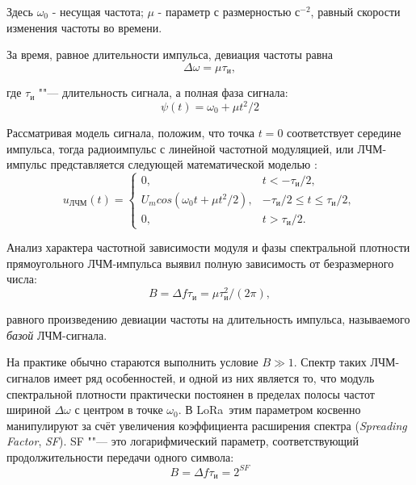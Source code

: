 Здесь $\omega_0$ - несущая частота; $\mu$ - параметр с размерностью с$^{-2}$, 
равный скорости изменения частоты во времени.

За время, равное длительности импульса, девиация частоты равна
\begin{equation}
	\Delta \omega = \mu \tau_{\text{и}},
\end{equation}

где $\tau_{\text{и}}$ ""--- длительность сигнала, а полная фаза сигнала:
\begin{equation}
	\psi(t) = \omega_0 + \mu t{^2}/2
\end{equation}

Рассматривая модель сигнала, положим, что точка $t = 0$ соответствует середине импульса, 
тогда радиоимпульс с линейной частотной модуляцией, или ЛЧМ-импульс представляется 
следующей математической моделью \cite{Baskakov2003}:
\begin{equation}
	u_\text{ЛЧМ}(t) = 
	\begin{cases}
		0, & t < -\tau_\text{и}/2,\\
		U_m cos(\omega_0 t + \mu t{^2}/2), & -\tau_\text{и}/2 \le t \le 
\tau_\text{и}/2,\\
		0, & t > \tau_\text{и}/2.
	\end{cases}
\end{equation}

Анализ характера частотной зависимости модуля и фазы спектральной плотности 
прямоугольного ЛЧМ-импульса выявил \cite{Baskakov2003} полную зависимость от 
безразмерного числа:
\begin{equation}
	B = \Delta f \tau_\text{и} = \mu \tau^{2}_{\text{и}}/(2\pi),
\end{equation}

равного произведению девиации частоты на длительность импульса, называемого 
\textit{базой} ЛЧМ-сигнала.

На практике обычно стараются выполнить условие $B \gg 1$. 
Спектр таких ЛЧМ-сигналов имеет ряд особенностей, и одной из них является то, 
что модуль спектральной плотности практически постоянен в пределах полосы 
частот 
шириной $\Delta \omega$ с центром в точке $\omega_0$.
В LoRa\texttrademark~этим параметром косвенно манипулируют за счёт увеличения 
коэффициента 
расширения спектра (\textit{Spreading Factor}, \textit{SF}).
SF ""--- это логарифмический параметр, соответствующий продолжительности 
передачи одного символа:
\begin{equation}
	B = \Delta f \tau_\text{и} = 2^{SF}
\end{equation}

